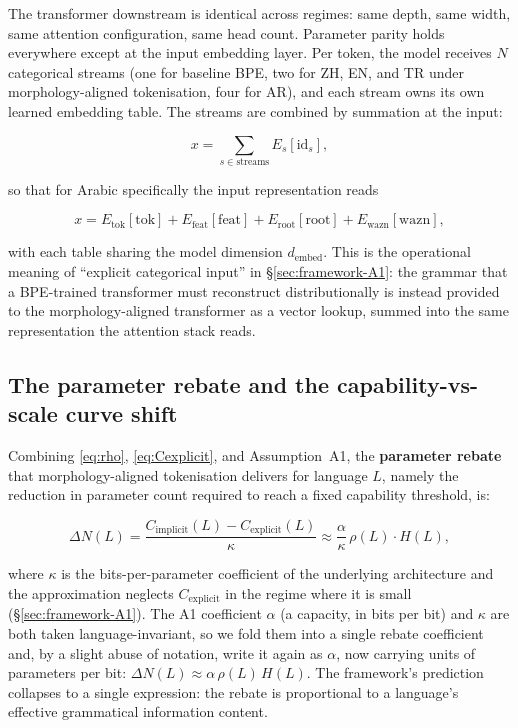 The transformer downstream is identical across regimes: same depth, same width, same attention configuration, same head count. Parameter parity holds everywhere except at the input embedding layer. Per token, the model receives $N$ categorical streams (one for baseline BPE, two for ZH, EN, and TR under morphology-aligned tokenisation, four for AR), and each stream owns its own learned embedding table. The streams are combined by summation at the input:

\begin{equation}
x = \sum_{s \in \mathrm{streams}} E_s[\mathrm{id}_s],
\label{eq:embedsum}
\end{equation}

so that for Arabic specifically the input representation reads

\[
x = E_{\mathrm{tok}}[\mathrm{tok}] + E_{\mathrm{feat}}[\mathrm{feat}] + E_{\mathrm{root}}[\mathrm{root}] + E_{\mathrm{wazn}}[\mathrm{wazn}],
\]

with each table sharing the model dimension $d_{\mathrm{embed}}$. This is the operational meaning of ``explicit categorical input'' in \S\ref{sec:framework-A1}: the grammar that a BPE-trained transformer must reconstruct distributionally is instead provided to the morphology-aligned transformer as a vector lookup, summed into the same representation the attention stack reads.

\subsection{The parameter rebate and the capability-vs-scale curve shift}
\label{sec:framework-rebate}

Combining \ref{eq:rho}, \ref{eq:Cexplicit}, and Assumption~A1, the \textbf{parameter rebate} that morphology-aligned tokenisation delivers for language $L$, namely the reduction in parameter count required to reach a fixed capability threshold, is:

\begin{equation}
\Delta N(L) = \frac{C_{\mathrm{implicit}}(L) - C_{\mathrm{explicit}}(L)}{\kappa} \approx \frac{\alpha}{\kappa}\, \rho(L) \cdot H(L),
\label{eq:rebate}
\end{equation}

where $\kappa$ is the bits-per-parameter coefficient of the underlying architecture and the approximation neglects $C_{\mathrm{explicit}}$ in the regime where it is small (\S\ref{sec:framework-A1}). The A1 coefficient $\alpha$ (a capacity, in bits per bit) and $\kappa$ are both taken language-invariant, so we fold them into a single rebate coefficient and, by a slight abuse of notation, write it again as $\alpha$, now carrying units of parameters per bit: $\Delta N(L) \approx \alpha\,\rho(L)\,H(L)$. The framework's prediction collapses to a single expression: the rebate is proportional to a language's effective grammatical information content.

